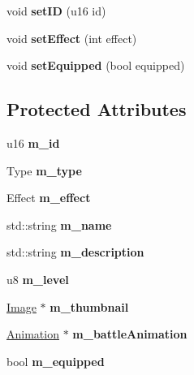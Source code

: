 \begin{DoxyCompactItemize}
\item 
\hypertarget{classItem_a91a18049f25e159d961a3bb1c9d89145}{void {\bfseries set\-I\-D} (u16 id)}\label{classItem_a91a18049f25e159d961a3bb1c9d89145}

\item 
\hypertarget{classItem_a0f39e33ed8168d5ebf858b18d8dc989a}{void {\bfseries set\-Effect} (int effect)}\label{classItem_a0f39e33ed8168d5ebf858b18d8dc989a}

\item 
\hypertarget{classItem_a6a09c15d95f8710bd44b1d1a87d206b4}{void {\bfseries set\-Equipped} (bool equipped)}\label{classItem_a6a09c15d95f8710bd44b1d1a87d206b4}

\end{DoxyCompactItemize}
\subsection*{Protected Attributes}
\begin{DoxyCompactItemize}
\item 
\hypertarget{classItem_a1dc38a7820d7a23a4ddcad2a105b571c}{u16 {\bfseries m\-\_\-id}}\label{classItem_a1dc38a7820d7a23a4ddcad2a105b571c}

\item 
\hypertarget{classItem_a7394c7bdb4c682713a8a68bc581b2961}{Type {\bfseries m\-\_\-type}}\label{classItem_a7394c7bdb4c682713a8a68bc581b2961}

\item 
\hypertarget{classItem_a8fb94c83f48fc704f2d03158ad7ccb35}{Effect {\bfseries m\-\_\-effect}}\label{classItem_a8fb94c83f48fc704f2d03158ad7ccb35}

\item 
\hypertarget{classItem_a9f437f59055ce14b5345ccec641d244c}{std\-::string {\bfseries m\-\_\-name}}\label{classItem_a9f437f59055ce14b5345ccec641d244c}

\item 
\hypertarget{classItem_ad86b0caabc1b99000db02358fb94ed17}{std\-::string {\bfseries m\-\_\-description}}\label{classItem_ad86b0caabc1b99000db02358fb94ed17}

\item 
\hypertarget{classItem_ae5c2d96c278ccda3144ad8e894ed9210}{u8 {\bfseries m\-\_\-level}}\label{classItem_ae5c2d96c278ccda3144ad8e894ed9210}

\item 
\hypertarget{classItem_a7104580067c6ccaf7aa2ae886399441b}{\hyperlink{classImage}{Image} $\ast$ {\bfseries m\-\_\-thumbnail}}\label{classItem_a7104580067c6ccaf7aa2ae886399441b}

\item 
\hypertarget{classItem_a928129e5738973ec62b264772448b51a}{\hyperlink{classAnimation}{Animation} $\ast$ {\bfseries m\-\_\-battle\-Animation}}\label{classItem_a928129e5738973ec62b264772448b51a}

\item 
\hypertarget{classItem_aa5b8b59bc839bdd1a9bd835b0fc4e86c}{bool {\bfseries m\-\_\-equipped}}\label{classItem_aa5b8b59bc839bdd1a9bd835b0fc4e86c}

\end{DoxyCompactItemize}


